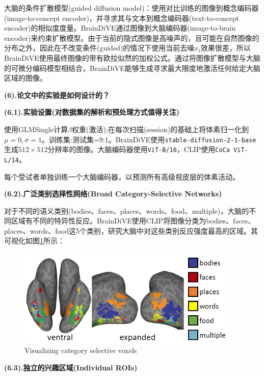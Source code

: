 \documentclass[12pt, a4paper, oneside]{ctexart}
\begin{document}
    大脑的条件扩散模型(guided diffusion model)：使用对比训练的图像到概念编码器(image-to-concept encoder)，并寻求其与文本到概念编码器(text-to-concept encoder)的相似度度量。BrainDiVE通过图像到大脑编码器(image-to-brain encoder)来约束扩散模型。由于当前的隐式图像是高噪声的，且可能在自然图像的分布之外，因此在不改变条件(guided)的情况下使用当前去噪$x_t$效果很差，所以BrainDiVE使用最终图像的带有欧拉似然的加权公式。通过将图像扩散模型与大脑的可微分编码模型相结合，BrainDiVE能够生成寻求最大限度地激活任何给定大脑区域的图像。

    \noindent\textbf{(6).论文中的实验是如何设计的？}

    \noindent\textbf{(6.1).实验设置(对数据集的解析和预处理方式值得关注)}

    使用GLMSingle\cite{10.7554/eLife.77599}计算$\beta$权重(激活);在每次扫描(session)的基础上将体素归一化到$\mu=0,\sigma=1$。训练集:测试集=9:1。BrainDiVE使用\texttt{stable-diffusion-2-1-base}生成$512\times512$分辨率的图像。大脑编码器使用\texttt{ViT-B/16}，CLIP使用\texttt{CoCa ViT-L/14}。

    每个受试者单独训练一个大脑编码器，以预测所有高级视皮层的体素活动。

    \noindent\textbf{(6.2).广泛类别选择性网络(Broad Category-Selective Networks)}

    对于不同的语义类别(bodies、faces、places、words、food、multiple)，大脑的不同区域有不同的特异性反应。BrainDiVE使用CLIP将图像分类为bodies、faces、places、words、food这5个类别，研究大脑中对这些类别反应强度最高的区域。其可视化如图\ref{visualize selective voxels}所示：

    \begin{figure}[htbp]
        \centering
        \includegraphics[width=0.95\textwidth]{pic/4.11_Visualizing_category_selective_voxels.png}
        \caption{Visualizing category selective voxels}
        \label{visualize selective voxels}
    \end{figure}

    \noindent\textbf{(6.3).独立的兴趣区域(Individual ROIs)}
\end{document}
